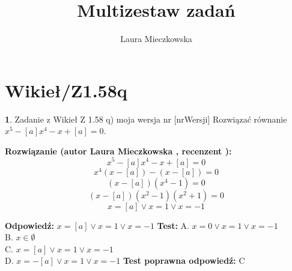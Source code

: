 \documentclass[12pt, a4paper]{article}
\title{Multizestaw zadań}
\author{Laura Mieczkowska}
\date{}
\theoremstyle{definition} %
\newtheorem{zad}{}
\newcommand{\kategoria}[1]{\section{#1}} %
\newcommand{\zadStart}[1]{\begin{zad}#1\newline} %
\newcommand{\zadStop}{\end{zad}}   %
\newcommand{\rozwStart}[2]{\noindent \textbf{Rozwiązanie (autor #1 , recenzent #2): }\newline} %
\newcommand{\odpStart}{\noindent \textbf{Odpowiedź:}\newline}    %
\newcommand{\odpStop}{\newline}                                             %
\newcommand{\testStart}{\noindent \textbf{Test:}\newline} %
\newcommand{\testStop}{\newline} %
\newcommand{\kluczStart}{\noindent \textbf{Test poprawna odpowiedź:}\newline} %
\newcommand{\kluczStop}{\newline} %
\begin{document}
\maketitle


\kategoria{Wikieł/Z1.58q}
\zadStart{Zadanie z Wikieł Z 1.58 q) moja wersja nr [nrWersji]}
Rozwiązać równanie $x^5-[a]x^4-x+[a]=0$.
\zadStop
\rozwStart{Laura Mieczkowska}{}
$$x^5-[a]x^4-x+[a]=0$$
$$x^4(x-[a])-(x-[a])=0$$
$$(x-[a])(x^4-1)=0$$
$$(x-[a])(x^2-1)(x^2+1)=0$$
$$x=[a] \vee x=1 \vee x=-1$$

\odpStart
$x=[a] \vee x=1 \vee x=-1$
\odpStop
\testStart
A. $x=0 \vee x=1 \vee x=-1$ \\
B. $x\in\emptyset$ \\
C. $x=[a] \vee x=1 \vee x=-1$ \\
D. $x=-[a] \vee x=1 \vee x=-1$ 
\testStop
\kluczStart
C
\kluczStop
\end{document}

